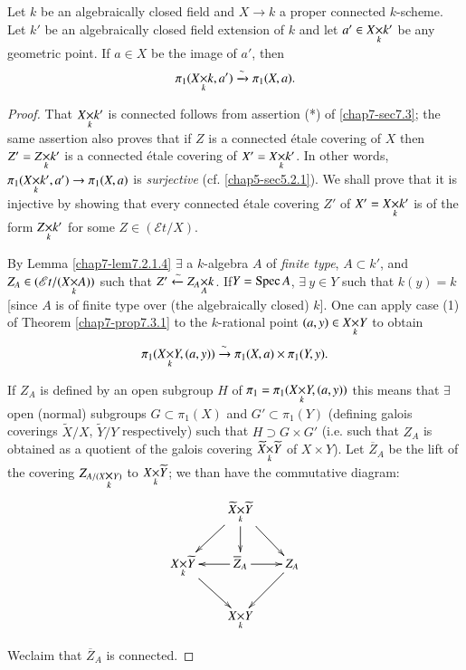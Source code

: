 \begin{prop}\label{chap7-prop7.3.2}
Let $k$ be an algebraically closed field and $X\to k$ a proper
connected $k$-scheme. Let $k'$ be an algebraically closed field
extension of $k$ and let $a'\in \fprod{X}{k'}{k}$ be any geometric
point. If $a\in X$ be the image of $a'$, then
$$
\pi_{1}(\fprod{X}{k}{k},a')\xrightarrow{\sim}\pi_{1}(X,a).
$$
\end{prop}


\begin{proof}
That $\fprod{X}{k'}{k}$ is connected follows from assertion (*) of
\ref{chap7-sec7.3}; the same assertion also proves that if $Z$ is a
connected \'etale covering of $X$ then $Z'=\fprod{Z}{k'}{k}$ is a
connected \'etale covering of $X'=\fprod{X}{k'}{k}$. In other words,
$\pi_{1}(\fprod{X}{k'}{k},a')\to \pi_{1}(X,a)$ is {\em surjective}
(cf. \ref{chap5-sec5.2.1}). We shall prove that it is injective by showing
that every connected \'etale covering $Z'$ of $X'=\fprod{X}{k'}{k}$ is
of the form $\fprod{Z}{k'}{k}$ for some $Z\in (\mathscr{E}t/X)$. 

By Lemma \ref{chap7-lem7.2.1.4} $\exists$ a $k$-algebra $A$ of {\em finite
  type}, $A\subset k'$, and $Z_{A}\in
(\mathscr{E}t/(\fprod{X}{A}{k}))$ such that
$Z'\xleftarrow{\sim}\fprod{Z_{A}}{k}{A}$. 
If\pageoriginale $Y=\operatorname{Spec} A$, $\exists\ y\in Y$ such that $k(y)=k$
[since $A$ is of finite type over (the algebraically closed) $k$]. One
can apply case (1) of Theorem \ref{chap7-prop7.3.1} to the $k$-rational point
$(a,y)\in\fprod{X}{Y}{k}$ to obtain
$$
\pi_{1}(\fprod{X}{Y}{k},(a,y))\xrightarrow{\sim}\pi_{1}(X,a)\times\pi_{1}(Y,y). 
$$

If $Z_{A}$ is defined by an open subgroup $H$ of
$\pi_{1}=\pi_{1}(\fprod{X}{Y}{k},(a,y))$ this means that $\exists$
open (normal) subgroups $G\subset \pi_{1}(X)$ and $G'\subset
\pi_{1}(Y)$ (defining galois coverings $\widetilde{X}/X$,
$\widetilde{Y}/Y$ respectively) such that $H\supset G\times G'$
(i.e. such that $Z_{A}$ is obtained as a quotient of the galois
covering $\fprod{\widetilde{X}}{\widetilde{Y}}{k}$ of $X\times
Y$). Let $\overline{Z}_{A}$ be the lift of the covering
$Z_{A/(\fprod{X}{Y}{k})}$ to $\fprod{X}{\widetilde{Y}}{k}$; we than
have the commutative diagram:
\[
\xymatrix@=.7cm{
 & \fprod{\widetilde{X}}{\widetilde{Y}}{k}\ar[dr]\ar[dl]\ar[d] & \\
\fprod{X}{\widetilde{Y}}{k}\ar[dr] & \overline{Z}_{A}\ar[l]\ar[r] &
Z_{A}\ar[dl]\\
 & \fprod{X}{Y}{k}
}
\]

We\pageoriginale claim that $\overline{Z}_{A}$ is connected.


\end{proof}
